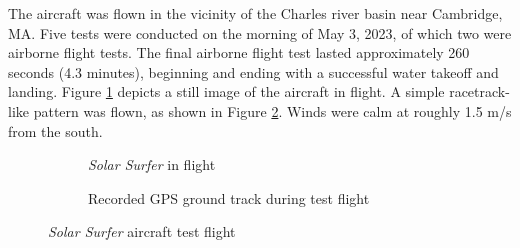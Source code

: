 \documentclass[conf]{new-aiaa}
\begin{document}
    The aircraft was flown in the vicinity of the Charles river basin near Cambridge, MA. Five tests were conducted on the morning of May 3, 2023, of which two were airborne flight tests. The final airborne flight test lasted approximately 260 seconds (4.3 minutes), beginning and ending with a successful water takeoff and landing. Figure \ref{fig:solar_surfer_flight} depicts a still image of the aircraft in flight. A simple racetrack-like pattern was flown, as shown in Figure \ref{fig:solar_surfer_track}. Winds were calm at roughly 1.5 m/s from the south.

    \begin{figure}[!htb]
        \centering
        \begin{subfigure}[b]{0.45\textwidth}
            \caption{\emph{Solar Surfer} in flight}
            \label{fig:solar_surfer_flight}
        \end{subfigure}
        \hfill
        \begin{subfigure}[b]{0.511\textwidth}
            \caption{Recorded GPS ground track during test flight}
            \label{fig:solar_surfer_track}
        \end{subfigure}
        \caption{\emph{Solar Surfer} aircraft test flight}
        \label{fig:solar_surfer_aircraft}
    \end{figure}
\end{document}
